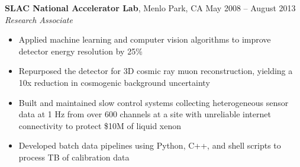 \documentclass[margin,line]{resume}
\begin{document}
\begin{resume}
    \textbf{SLAC National Accelerator Lab}, Menlo Park, CA \hfill May 2008 -- August 2013\vspace{1mm}\\\vspace{1mm}%
    \textsl{Research Associate}
    \begin{itemize}
    \item Applied machine learning and computer vision algorithms to improve detector energy resolution by 25\%
    \item Repurposed the detector for 3D cosmic ray muon reconstruction, yielding a 10x reduction in cosmogenic background uncertainty
    \item Built and maintained slow control systems collecting heterogeneous sensor data at 1 Hz from over 600 channels at a site with unreliable internet connectivity to protect \$10M of liquid xenon
    \item Developed batch data pipelines using Python, C++, and shell scripts to process TB of calibration data
    \end{itemize}



\end{resume}
\end{document}
